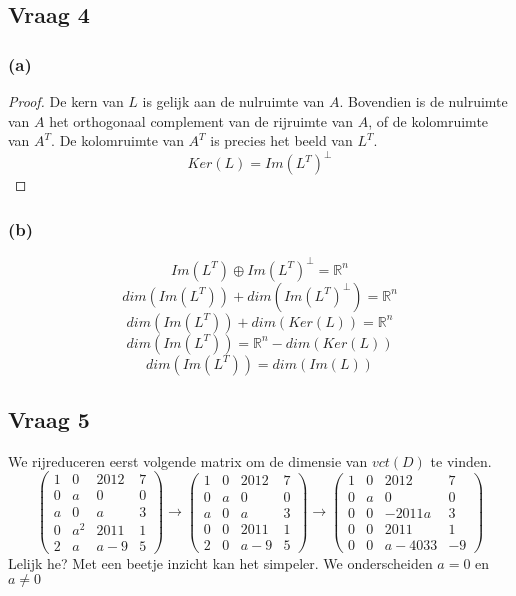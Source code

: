 \documentclass[lineaire_algebra_oplossingen.tex]{subfiles}
\begin{document}
\subsection{Vraag 4}
\subsubsection*{(a)}
\begin{proof}
De kern van $L$ is gelijk aan de nulruimte van $A$. Bovendien is de nulruimte van $A$ het orthogonaal complement van de rijruimte van $A$, of de kolomruimte van $A^T$. De kolomruimte van $A^T$ is precies het beeld van $L^T$.
\[
Ker(L) = Im(L^T)^\bot
\]
\end{proof}


\subsubsection*{(b)}
\[
Im(L^T) \oplus Im(L^T)^\bot = \mathbb{R}^n
\]
\[
dim(Im(L^T)) + dim(Im(L^T)^\bot) = \mathbb{R}^n
\]
\[
dim(Im(L^T)) + dim(Ker(L)) = \mathbb{R}^n
\]
\[
dim(Im(L^T)) = \mathbb{R}^n - dim(Ker(L))
\]
\[
dim(Im(L^T)) = dim(Im(L))
\]

\subsection{Vraag 5}
We rijreduceren eerst volgende matrix om de dimensie van $vct(D)$ te vinden.
\[
\begin{pmatrix}
1 & 0 & 2012 & 7\\
0 & a & 0 & 0\\
a & 0 & a & 3\\
0 & a^2 & 2011 & 1\\
2 & a & a-9 & 5
\end{pmatrix}
\rightarrow
\begin{pmatrix}
1 & 0 & 2012 & 7\\
0 & a & 0 & 0\\
a & 0 & a & 3\\
0 & 0 & 2011 & 1\\
2 & 0 & a-9 & 5
\end{pmatrix}
\rightarrow
\begin{pmatrix}
1 & 0 & 2012 & 7\\
0 & a & 0 & 0\\
0 & 0 & -2011a & 3\\
0 & 0 & 2011 & 1\\
0 & 0 & a-4033 & -9
\end{pmatrix}
\]
Lelijk he? Met een beetje inzicht kan het simpeler. We onderscheiden $a=0$ en $a\neq 0$
\end{document}
